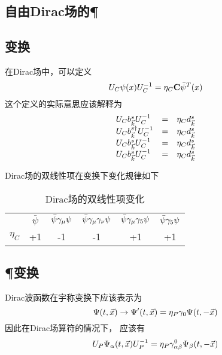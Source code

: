 \subsection{自由Dirac场的\C \P \T}
\subsection{\C 变换}
在Dirac场中，可以定义
\begin{equation}
    U_{C} \psi(x) U_{C}^{-1} = \eta_C \textbf{C} \bar \psi^T(x)
\end{equation}
这个定义的实际意思应该解释为
\begin{equation}
    \begin{array}{lll}
        U_{C} b_{\vec k}^sU_{C}^{-1} &=& \eta_C d_{\vec k}^s \\
        U_{C} b_{\vec k}^{s\dagger}U_{C}^{-1} &=& \eta_C d_{\vec k}^s \\
        U_{C} b_{\vec k}^sU_{C}^{-1} &=& \eta_C d_{\vec k}^s \\
        U_{C} b_{\vec k}^sU_{C}^{-1} &=& \eta_C d_{\vec k}^s \\
    \end{array}
\end{equation}

Dirac场的双线性项在\C 变换下变化规律如下
\begin{table}[h]
    \caption{Dirac场的双线性项变化}
    \centering
    \begin{tabular}{cccccc}
        & $\bar \psi$ & $\bar \psi \gamma_{\mu} \psi$ & $\bar \psi \gamma_{\mu} \gamma_{\nu} \psi$ &
        $\bar \psi \gamma_{\mu} \gamma_{5} \psi$ & $\bar \psi \gamma_{5} \psi$ \\
        $\eta_C$ & +1 & -1 & -1 & +1 & +1
    \end{tabular}
\end{table}

\subsection{\P 变换}
Dirac波函数在宇称变换下应该表示为
\begin{equation}
    \Psi(t, \vec x) \rightarrow \Psi^\prime(t, \vec x) = \eta_P \gamma_{0} \Psi(t, -\vec x)
\end{equation}
因此在Dirac场算符的情况下，
应该有
\begin{equation}
    U_{P} \Psi_\alpha(t, \vec x) U_{P}^{-1} = \eta_P \gamma^{0}_{\alpha\beta} \Psi_\beta(t, -\vec x)
\end{equation}

